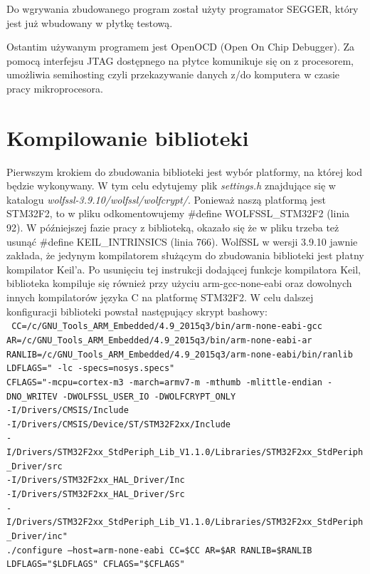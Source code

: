 \documentclass[oneside]{mgr}
\begin{document}
Do wgrywania zbudowanego program został użyty programator SEGGER, który jest już wbudowany w płytkę testową.

Ostantim używanym programem jest OpenOCD (Open On Chip Debugger). Za pomocą interfejsu JTAG dostępnego na płytce komunikuje się on z procesorem, umożliwia semihosting czyli przekazywanie danych z/do komputera w czasie pracy mikroprocesora.

\section{Kompilowanie biblioteki}

Pierwszym krokiem do zbudowania biblioteki jest wybór platformy, na której kod będzie wykonywany. W tym celu edytujemy plik \textit{settings.h} znajdujące się w katalogu \textit{wolfssl-3.9.10/wolfssl/wolfcrypt/}. Ponieważ naszą platformą jest STM32F2, to w pliku odkomentowujemy \#define WOLFSSL\_STM32F2 (linia 92). W późniejszej fazie pracy z biblioteką, okazało się że w pliku trzeba też usunąć \#define KEIL\_INTRINSICS (linia 766). WolfSSL w wersji 3.9.10 jawnie zakłada, że jedynym kompilatorem służącym do zbudowania biblioteki jest płatny kompilator Keil'a. Po usunięciu tej instrukcji dodającej funkcje kompilatora Keil, biblioteka kompiluje się również przy użyciu arm-gcc-none-eabi oraz dowolnych innych kompilatorów języka C na platformę STM32F2.
W celu dalszej konfiguracji biblioteki powstał następujący skrypt bashowy:\\
\texttt{
CC=/c/GNU\_Tools\_ARM\_Embedded/4.9\_2015q3/bin/arm-none-eabi-gcc\\
AR=/c/GNU\_Tools\_ARM\_Embedded/4.9\_2015q3/bin/arm-none-eabi-ar\\
RANLIB=/c/GNU\_Tools\_ARM\_Embedded/4.9\_2015q3/arm-none-eabi/bin/ranlib\\
LDFLAGS=" -lc -specs=nosys.specs"\\
CFLAGS="-mcpu=cortex-m3 -march=armv7-m -mthumb -mlittle-endian -DNO\_WRITEV -DWOLFSSL\_USER\_IO -DWOLFCRYPT\_ONLY\\-I/Drivers/CMSIS/Include\\-I/Drivers/CMSIS/Device/ST/STM32F2xx/Include\\-I/Drivers/STM32F2xx\_StdPeriph\_Lib\_V1.1.0/Libraries/STM32F2xx\_StdPeriph\_Driver/src\\-I/Drivers/STM32F2xx\_HAL\_Driver/Inc \\-I/Drivers/STM32F2xx\_HAL\_Driver/Src\\-I/Drivers/STM32F2xx\_StdPeriph\_Lib\_V1.1.0/Libraries/STM32F2xx\_StdPeriph\_Driver/inc"\\
./configure --host=arm-none-eabi CC=\$CC AR=\$AR RANLIB=\$RANLIB LDFLAGS="\$LDFLAGS" CFLAGS="\$CFLAGS"	
}
\end{document}
